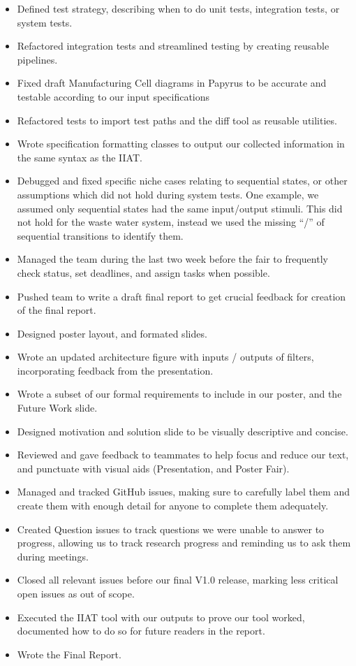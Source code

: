 \begin{itemize}
    \item Defined test strategy, describing when to do unit tests, integration tests, or system tests.
    \item Refactored integration tests and streamlined testing by creating reusable pipelines.
    \item Fixed draft Manufacturing Cell diagrams in Papyrus to be accurate and testable according to our input specifications
    \item Refactored tests to import test paths and the diff tool as reusable utilities.
    \item Wrote specification formatting classes to output our collected information in the same syntax as the IIAT\@.
    \item Debugged and fixed specific niche cases relating to sequential states, or other assumptions which did not hold during system tests.
    One example, we assumed only sequential states had the same input/output stimuli.
    This did not hold for the waste water system, instead we used the missing ``/'' of sequential transitions to identify them.
    \item Managed the team during the last two week before the fair to frequently check status, set deadlines, and assign tasks when possible.
    \item Pushed team to write a draft final report to get crucial feedback for creation of the final report.
    \item Designed poster layout, and formated slides.
    \item Wrote an updated architecture figure with inputs / outputs of filters, incorporating feedback from the presentation.
    \item Wrote a subset of our formal requirements to include in our poster, and the Future Work slide.
    \item Designed motivation and solution slide to be visually descriptive and concise.
    \item Reviewed and gave feedback to teammates to help focus and reduce our text, and punctuate with visual aids (Presentation, and Poster Fair).
    \item Managed and tracked GitHub issues, making sure to carefully label them and create them with enough detail for anyone to complete them adequately.
    \item Created Question issues to track questions we were unable to answer to progress,
    allowing us to track research progress and reminding us to ask them during meetings.
    \item Closed all relevant issues before our final V1.0 release, marking less critical open issues as out of scope.
    \item Executed the IIAT tool with our outputs to prove our tool worked, documented how to do so for future readers in the report.
    \item Wrote the Final Report.
\end{itemize}

